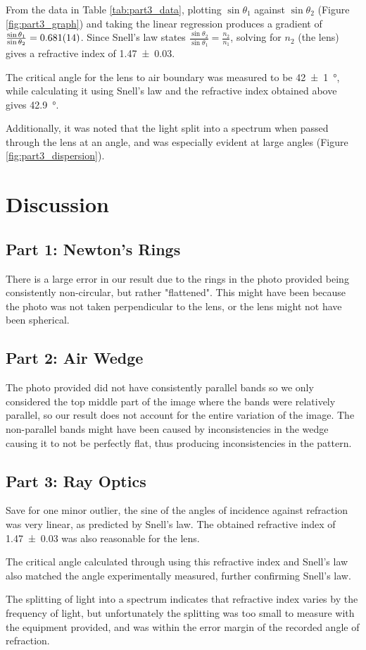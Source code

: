 \documentclass[a4paper]{scrartcl}
\begin{document}
From the data in Table \ref{tab:part3_data}, plotting \(\sin\theta_1\) against \(\sin\theta_2\) (Figure \ref{fig:part3_graph}) and taking the linear regression produces a gradient of \(\frac{\sin\theta_1}{\sin\theta_2} = \SI{0.681 \pm 0.014}{}\). Since Snell's law states \(\frac{\sin\theta_2}{\sin\theta_1} = \frac{n_2}{n_1}\), solving for \(n_2\) (the lens) gives a refractive index of \SI{1.47 \pm 0.03}{}.

The critical angle for the lens to air boundary was measured to be \SI{42 \pm 1}{\degree}, while calculating it using Snell's law and the refractive index obtained above gives \SI{42.9}{\degree}.

Additionally, it was noted that the light split into a spectrum when passed through the lens at an angle, and was especially evident at large angles (Figure \ref{fig:part3_dispersion}).

\section{Discussion}
\subsection{Part 1: Newton's Rings}
There is a large error in our result due to the rings in the photo provided being consistently non-circular, but rather "flattened". This might have been because the photo was not taken perpendicular to the lens, or the lens might not have been spherical.

\subsection{Part 2: Air Wedge}
The photo provided did not have consistently parallel bands so we only considered the top middle part of the image where the bands were relatively parallel, so our result does not account for the entire variation of the image. The non-parallel bands might have been caused by inconsistencies in the wedge causing it to not be perfectly flat, thus producing inconsistencies in the pattern.

\subsection{Part 3: Ray Optics}
Save for one minor outlier, the sine of the angles of incidence against refraction was very linear, as predicted by Snell's law. The obtained refractive index of \SI{1.47 \pm 0.03}{} was also reasonable for the lens.

The critical angle calculated through using this refractive index and Snell's law also matched the angle experimentally measured, further confirming Snell's law.

The splitting of light into a spectrum indicates that refractive index varies by the frequency of light, but unfortunately the splitting was too small to measure with the equipment provided, and was within the error margin of the recorded angle of refraction.
\end{document}
